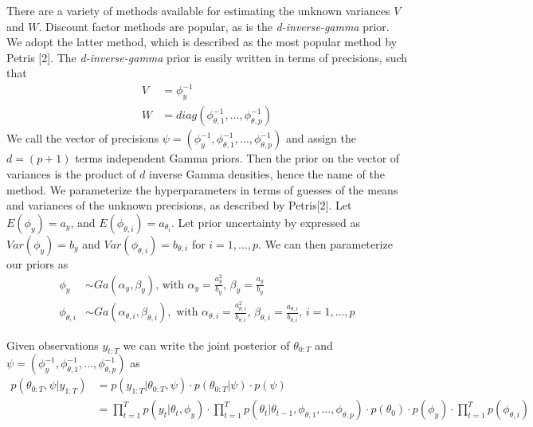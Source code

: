 \documentclass{article}
\begin{document}
There are a variety of methods available for estimating the unknown variances $V$ and $W$.  Discount factor methods are popular, as is the \emph{d-inverse-gamma} prior.  We adopt the latter method, which is described as the most popular method by Petris [2].  The \emph{d-inverse-gamma} prior is easily written in terms of precisions, such that
\begin{align*}
	V &= \phi_y ^{-1} \\
	W &= diag\left(\phi_{\theta,1} ^{-1} , \hdots , \phi_{\theta,p} ^{-1} \right)
\end{align*}
We call the vector of precisions $\psi = \left(\phi_y ^{-1}, \phi_{\theta,1} ^{-1} , \hdots , \phi_{\theta,p} ^{-1} \right)$ and assign the $d=(p+1)$ terms independent Gamma priors.  Then the prior on the vector of variances is the product of $d$ inverse Gamma densities, hence the name of the method.  We parameterize the hyperparameters in terms of guesses of the means and variances of the unknown precisions, as described by Petris[2].  Let $E(\phi_y) = a_y$, and $E(\phi_{\theta,i}) = a_{\theta_i}$.  Let prior uncertainty by expressed as $Var(\phi_y) = b_y$ and $Var(\phi_{\theta,i}) = b_{\theta,i}$ for $i = 1,\hdots,p$.  We can then parameterize our priors as
\begin{align*}
	\phi_y &\sim Ga(\alpha_y, \beta_y) \text{, with } \alpha_y = \frac{a_y^2}{b_y} \text{, } \beta_y = \frac{a_y}{b_y}\\
	\phi_{\theta,i} &\sim Ga(\alpha_{\theta,i},\beta_{\theta,i}), 
		\text{ with } \alpha_{\theta,i} = \frac{a_{\theta,i}^2}{b_{\theta,i}} \text{, }
		\beta_{\theta,i} = \frac{a_{\theta,i}}{b_{\theta,i}} \text{, } i = 1,\hdots,p
\end{align*}

Given observations $y_{t:T}$ we can write the joint posterior of $\theta_{0:T}$ 
and $\psi = \left(\phi_y ^{-1}, \phi_{\theta,1} ^{-1} , \hdots , \phi_{\theta,p} ^{-1} \right)$ as
\begin{align*}
	p\left(\theta_{0:T}, \psi | y_{1:T} \right) &= 
	p\left(y_{1:T} | \theta_{0:T}, \psi \right) \cdot 
	p\left(\theta_{0:T} | \psi  \right) \cdot 
	p\left(\psi \right) \\
	&=\prod_{t=1}^{T} p\left(y_t | \theta_t, \phi_y \right)
	\cdot 
	\prod_{t=1}^{T} p\left(\theta_t | \theta_{t-1}, \phi_{\theta,1}, \hdots, \phi_{\theta,p} \right)
	\cdot
	p\left(\theta_0 \right)
	\cdot
	p\left(\phi_y \right)
	\cdot \prod_{t=1}^{T} p(\phi_{\theta,i})
\end{align*}
\end{document}
